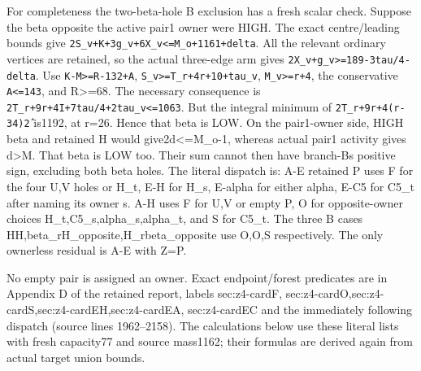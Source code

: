 \documentclass[10pt,a4paper]{article}
\theoremstyle{definition}
\begin{document}
For completeness the two-beta-hole B exclusion has a fresh scalar check.
Suppose the beta opposite the active pair1 owner were HIGH. The exact
centre/leading bounds give
\texttt{2S\_\allowbreak{}\allowbreak{}v+\allowbreak{}K+\allowbreak{}3g\_\allowbreak{}\allowbreak{}v+\allowbreak{}6X\_\allowbreak{}\allowbreak{}v<=\allowbreak{}M\_\allowbreak{}\allowbreak{}o+\allowbreak{}1161+\allowbreak{}delta}. All the
relevant ordinary vertices are retained,\allowbreak{} so the actual three-edge arm
gives \texttt{2X\_\allowbreak{}\allowbreak{}v+\allowbreak{}g\_\allowbreak{}\allowbreak{}v>=\allowbreak{}189-3tau/\allowbreak{}4-delta}. Use
\texttt{K-M>=\allowbreak{}R-132+\allowbreak{}A},\allowbreak{}
\texttt{S\_\allowbreak{}\allowbreak{}v>=\allowbreak{}T\_\allowbreak{}\allowbreak{}r+\allowbreak{}4r+\allowbreak{}10+\allowbreak{}tau\_\allowbreak{}\allowbreak{}v},\allowbreak{}
\texttt{M\_\allowbreak{}\allowbreak{}v>=\allowbreak{}r+\allowbreak{}4},\allowbreak{} the conservative
\texttt{A<=\allowbreak{}143},\allowbreak{} and R\textgreater=\allowbreak{}68. The necessary
consequence is
\texttt{2T\_\allowbreak{}\allowbreak{}r+\allowbreak{}9r+\allowbreak{}4I+\allowbreak{}7tau/\allowbreak{}4+\allowbreak{}2tau\_\allowbreak{}\allowbreak{}v<=\allowbreak{}1063}. But the
integral minimum of \texttt{2T\_\allowbreak{}\allowbreak{}r+\allowbreak{}9r+\allowbreak{}4(r-34)\^2}
is1192,\allowbreak{} at r=\allowbreak{}26. Hence that beta is LOW. On the pair1-owner side,\allowbreak{} HIGH
beta and retained H would give2d\textless=\allowbreak{}M\_\allowbreak{}o-1,\allowbreak{} whereas actual pair1
activity gives d\textgreater M. That beta is LOW too. Their sum cannot
then have branch-B\textquotesingle s positive sign,\allowbreak{} excluding both beta
holes. The literal dispatch is: A-E retained P uses F for the four U,\allowbreak{}V
holes or H\_\allowbreak{}t,\allowbreak{} E-H for H\_\allowbreak{}s,\allowbreak{} E-alpha for either alpha,\allowbreak{} E-C5 for C5\_\allowbreak{}t
after naming its owner s. A-H uses F for U,\allowbreak{}V or empty P,\allowbreak{} O for
opposite-owner choices H\_\allowbreak{}t,\allowbreak{}C5\_\allowbreak{}s,\allowbreak{}alpha\_\allowbreak{}s,\allowbreak{}alpha\_\allowbreak{}t,\allowbreak{} and S for C5\_\allowbreak{}t.
The three B cases HH,\allowbreak{}beta\_\allowbreak{}rH\_\allowbreak{}opposite,\allowbreak{}H\_\allowbreak{}rbeta\_\allowbreak{}opposite use O,\allowbreak{}O,\allowbreak{}S
respectively. The only ownerless residual is A-E with Z=\allowbreak{}P.

No empty pair is assigned an owner. Exact endpoint/forest predicates are
in Appendix D of the retained report,\allowbreak{} labels sec:z4-cardF,\allowbreak{}
sec:z4-cardO,\allowbreak{}sec:z4-cardS,\allowbreak{}sec:z4-cardEH,\allowbreak{}sec:z4-cardEA,\allowbreak{} sec:z4-cardEC and
the immediately following dispatch (source lines 1962--2158). The
calculations below use these literal lists with fresh capacity77 and
source mass1162; their formulas are derived again from actual target
union bounds.
\end{document}
